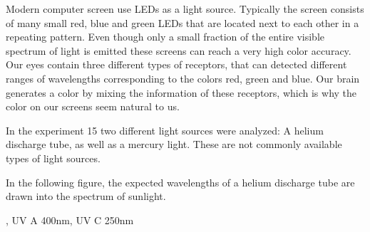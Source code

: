 Modern computer screen use LEDs as a light source. Typically the screen consists of many small red, blue and 
green LEDs that are located next to each other in a repeating pattern. Even though only a small fraction of 
the entire visible spectrum of light is emitted these screens can reach a very high color accuracy. Our eyes 
contain three different types of receptors, that can detected different ranges of wavelengths corresponding 
to the colors red, green and blue. Our brain generates a color by mixing the information of these receptors, 
which is why the color on our screens seem natural to us.

In the experiment 15 two different light sources were analyzed: A helium discharge tube, as well as
a mercury light. These are not commonly available types of light sources.

In the following figure, the expected wavelengths of a helium discharge tube are drawn into the spectrum of sunlight.

, UV A 400nm, UV C 250nm